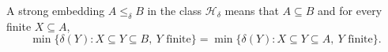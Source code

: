 A strong embedding $A \leq_{\delta} B$ in the class $\mathcal{H}_{\delta}$ means that $A \subseteq B$ and for every finite $X \subseteq A$,
$$\min\{\delta(Y) : X \subseteq Y \subseteq B,\ Y \text{ finite}\} = \min\{\delta(Y) : X \subseteq Y \subseteq A,\ Y \text{ finite}\}.$$
